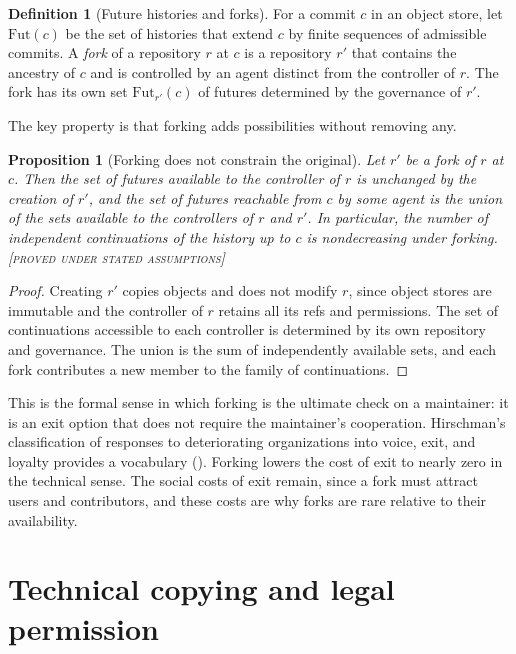 \documentclass[11pt,twoside,openright]{book}
\theoremstyle{plain}
\newtheorem{proposition}[theorem]{Proposition}
\theoremstyle{definition}
\newtheorem{definition}[theorem]{Definition}
\theoremstyle{remark}
\newcommand{\Proved}{\textup{\textsc{[proved under stated assumptions]}}}
\begin{document}
\begin{definition}[Future histories and forks]\label{def:futures}
For a commit $c$ in an object store, let $\mathrm{Fut}(c)$ be the set of histories that extend $c$ by finite sequences of admissible commits. A \emph{fork} of a repository $r$ at $c$ is a repository $r'$ that contains the ancestry of $c$ and is controlled by an agent distinct from the controller of $r$. The fork has its own set $\mathrm{Fut}_{r'}(c)$ of futures determined by the governance of $r'$.
\end{definition}

The key property is that forking adds possibilities without removing any.

\begin{proposition}[Forking does not constrain the original]\label{prop:forknoconstrain}
Let $r'$ be a fork of $r$ at $c$. Then the set of futures available to the controller of $r$ is unchanged by the creation of $r'$, and the set of futures reachable from $c$ by some agent is the union of the sets available to the controllers of $r$ and $r'$. In particular, the number of independent continuations of the history up to $c$ is nondecreasing under forking.
\Proved{}
\end{proposition}

\begin{proof}
Creating $r'$ copies objects and does not modify $r$, since object stores are immutable and the controller of $r$ retains all its refs and permissions. The set of continuations accessible to each controller is determined by its own repository and governance. The union is the sum of independently available sets, and each fork contributes a new member to the family of continuations.
\end{proof}

This is the formal sense in which forking is the ultimate check on a maintainer: it is an exit option that does not require the maintainer's cooperation. Hirschman's classification of responses to deteriorating organizations into voice, exit, and loyalty provides a vocabulary (\cite{hirschman1970}). Forking lowers the cost of exit to nearly zero in the technical sense. The social costs of exit remain, since a fork must attract users and contributors, and these costs are why forks are rare relative to their availability.

\section{Technical copying and legal permission}
\end{document}
